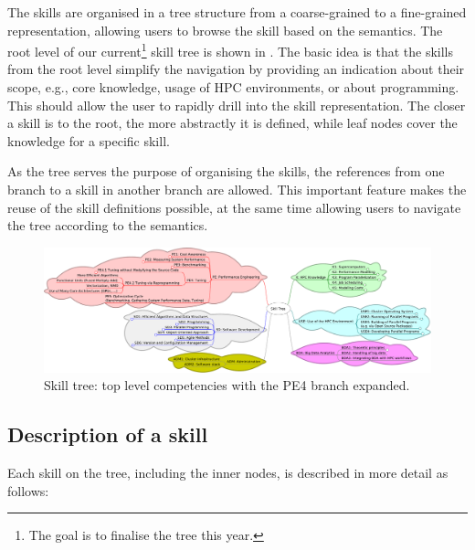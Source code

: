 \documentclass[jocse]{jocseart}
\begin{document}
The skills are organised in a tree structure from a coarse-grained to a fine-grained representation, allowing users to browse the skill based on the semantics.
The root level of our current\footnote{The goal is to finalise the tree this year.} skill tree is shown in .
The basic idea is that the skills from the root level simplify the navigation by providing an indication about their scope, e.g., core knowledge, usage of HPC environments, or about programming.
This should allow the user to rapidly drill into the skill representation.
The closer a skill is to the root, the more abstractly it is defined, while leaf nodes cover the knowledge for a specific skill.

As the tree serves the purpose of organising the skills, the references from one branch to a skill in another branch are allowed.
This important feature makes the reuse of the skill definitions possible, at the same time allowing users to navigate the tree according to the semantics.

\begin{figure}[tb!]
	\centering
	\includegraphics[width=15.0cm]{skill-tree}
	\caption{Skill tree: top level competencies with the PE4 branch expanded.}
	\label{fig:skill-tree}
\end{figure}

\subsection{Description of a skill}

Each skill on the tree, including the inner nodes, is described in more detail as follows:
\end{document}
